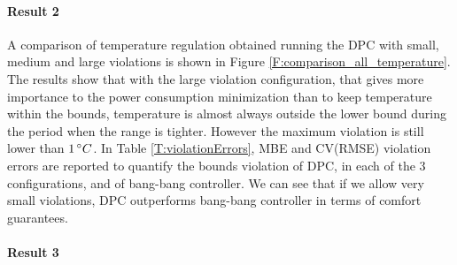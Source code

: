 \paragraph{Result 2} A comparison of temperature regulation obtained running the DPC with small, medium and large violations is shown in Figure \ref{F:comparison_all_temperature}. The results show that with the large violation configuration, that gives more importance to the power consumption minimization than to keep temperature within the bounds, temperature is almost always outside the lower bound during the period when the range is tighter. However the maximum violation is still lower than $1\,\degree C$.
In Table \ref{T:violationErrors}, MBE and CV(RMSE) violation errors are reported to quantify the bounds violation of DPC, in each of the $3$ configurations, and of bang-bang controller. We can see that if we allow very small violations, DPC outperforms bang-bang controller in terms of comfort guarantees.

\paragraph{Result 3} 

